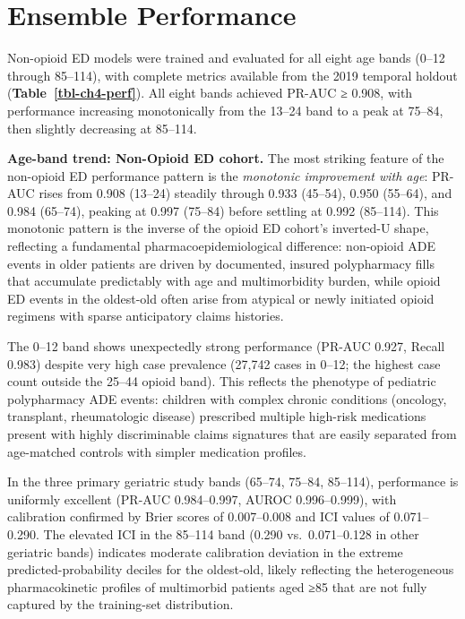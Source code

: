 \documentclass[
  12pt,
]{book}
\begin{document}
\section{Ensemble Performance}\label{ensemble-performance}

Non-opioid ED models were trained and evaluated for all eight age bands
(0--12 through 85--114), with complete metrics available from the 2019
temporal holdout (\textbf{Table~\ref{tbl-ch4-perf}}). All eight bands
achieved PR-AUC ≥ 0.908, with performance increasing monotonically from
the 13--24 band to a peak at 75--84, then slightly decreasing at
85--114.

\textbf{Age-band trend: Non-Opioid ED cohort.} The most striking feature
of the non-opioid ED performance pattern is the \emph{monotonic
improvement with age}: PR-AUC rises from 0.908 (13--24) steadily through
0.933 (45--54), 0.950 (55--64), and 0.984 (65--74), peaking at 0.997
(75--84) before settling at 0.992 (85--114). This monotonic pattern is
the inverse of the opioid ED cohort's inverted-U shape, reflecting a
fundamental pharmacoepidemiological difference: non-opioid ADE events in
older patients are driven by documented, insured polypharmacy fills that
accumulate predictably with age and multimorbidity burden, while opioid
ED events in the oldest-old often arise from atypical or newly initiated
opioid regimens with sparse anticipatory claims histories.

The 0--12 band shows unexpectedly strong performance (PR-AUC 0.927,
Recall 0.983) despite very high case prevalence (27,742 cases in 0--12;
the highest case count outside the 25--44 opioid band). This reflects
the phenotype of pediatric polypharmacy ADE events: children with
complex chronic conditions (oncology, transplant, rheumatologic disease)
prescribed multiple high-risk medications present with highly
discriminable claims signatures that are easily separated from
age-matched controls with simpler medication profiles.

In the three primary geriatric study bands (65--74, 75--84, 85--114),
performance is uniformly excellent (PR-AUC 0.984--0.997, AUROC
0.996--0.999), with calibration confirmed by Brier scores of
0.007--0.008 and ICI values of 0.071--0.290. The elevated ICI in the
85--114 band (0.290 vs.~0.071--0.128 in other geriatric bands) indicates
moderate calibration deviation in the extreme predicted-probability
deciles for the oldest-old, likely reflecting the heterogeneous
pharmacokinetic profiles of multimorbid patients aged ≥85 that are not
fully captured by the training-set distribution.
\end{document}
